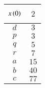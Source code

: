 \begin{tabular}{|p{4.5cm}|p{4.5cm}|}
    \hline
      $$x\left(0\right)$$ & $$2$$  \\ \hline
      $$d$$ & $$3$$  \\ \hline
      $$p$$ & $$3$$  \\ \hline
      $$q$$ & $$5$$  \\ \hline
      $$r$$ & $$7$$  \\ \hline
      $$a$$ & $$15$$  \\ \hline
      $$b$$ & $$40$$  \\ \hline
      $$c$$ & $$77$$  \\ \hline
\end{tabular}